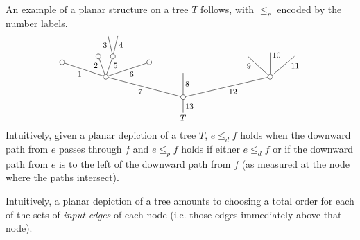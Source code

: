 \documentclass[a4paper,10pt]{article}%
\begin{document}
\begin{example}
  An example of a planar structure on a tree $T$ follows, with $\leq_r$ encoded by the number labels.
  \begin{equation}\label{PLANAREX EQ}
    \begin{tikzpicture}[grow=up,auto,level distance=2.1em,
      every node/.style = {font=\footnotesize,inner sep=2pt},
      dummy/.style={circle,draw,inner sep=0pt,minimum size=1.75mm}]
      \node at (0,0) {$T$}
      child{node [dummy] {}
        child[sibling distance = 9em]{node [dummy] {}
          child[sibling distance = 2.5em]{
            edge from parent node [near end,swap] {$11$}}
          child[level distance=2.5em]{
            edge from parent node [very near end,swap] {$10$}}				
          child[sibling distance = 2.3em]{
            edge from parent node [near end] {$9$}}
          edge from parent node [swap] {12}}
        child[level distance =2.5em]{
          edge from parent node [swap] {$8$}}
        child[sibling distance = 8em]{node [dummy] {}
          child[sibling distance =3em, level distance = 1.5 em]{node [dummy] {}
            edge from parent node [swap] {$6$}}
          child[sibling distance = 1.5em]{node [dummy] {}
            child[sibling distance =1em]{
              edge from parent node [swap,near end] {$4$}}
            child[sibling distance =1em]{
              edge from parent node [near end] {$3$}}
            edge from parent node [very near end,swap] {$5$}}
          child[sibling distance =1.5em]{node [dummy] {}
            edge from parent node [very near end] {$2$}}
          child[sibling distance =3em,level distance =1.5em]{node [dummy] {}
            edge from parent node {$1$}}
          edge from parent node {$7$}}
        edge from parent node [swap] {$13$}};
    \end{tikzpicture}
  \end{equation}
  Intuitively, given a planar depiction of a tree $T$, $e \leq_d f$ holds when the downward path from $e$ passes through $f$
  and $e \leq_p f$ holds if either
  $e \leq_d f$ or if the downward path from $e$ is to the left of the downward path from $f$ (as measured at the node where the paths intersect).
\end{example}



Intuitively, a planar depiction of a tree amounts to choosing a total order for each of the sets of \textit{input edges} of each node (i.e. those edges immediately above that node).
\end{document}

